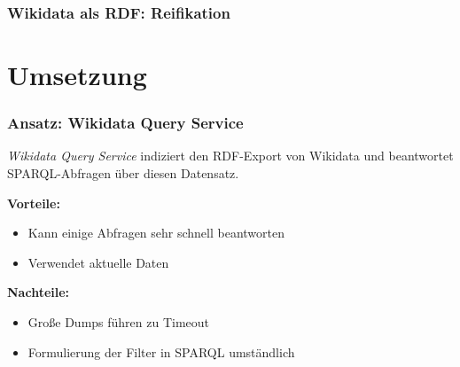 \documentclass[aspectratio=169,xcolor=usenames,dvipsnames,svgnames]{beamer}
\begin{document}
\begin{frame}[t, fragile]\frametitle{Wikidata als RDF: Reifikation}
  \vspace{-0.15cm}
  
\end{frame}


\section{Umsetzung}

\begin{frame}\frametitle{Ansatz: Wikidata Query Service}
  \emph{Wikidata Query Service} indiziert den RDF-Export von Wikidata und
  beantwortet SPARQL-Abfragen über diesen Datensatz.

  \textbf{Vorteile:}
  \begin{itemize}
    \item Kann einige Abfragen sehr schnell beantworten
    \item Verwendet aktuelle Daten
  \end{itemize}
  \textbf{Nachteile:}
  \begin{itemize}
    \item Große Dumps führen zu Timeout
    \item Formulierung der Filter in SPARQL umständlich
  \end{itemize}

\end{frame}
\end{document}

